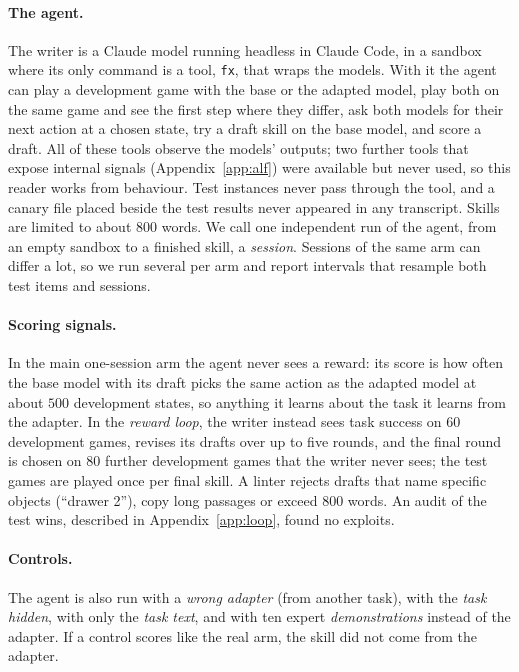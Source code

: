\documentclass[11pt]{article}
\begin{document}
\paragraph{The agent.} The writer is a Claude model running headless in Claude Code, in a sandbox where its only command is a tool, \texttt{fx},
that wraps the models. With it the agent can play a development game with the base or the adapted model, play both on the same game and see the
first step where they differ, ask both models for their next action at a chosen state, try a draft skill on the base model, and score a draft.
All of these tools observe the models' outputs; two further tools that expose internal signals (Appendix~\ref{app:alf}) were available but
never used, so this reader works from behaviour. Test instances never pass through the tool, and a canary file placed beside the test results never appeared in any transcript. Skills are limited
to about $800$ words. We call one independent run of the agent, from an empty sandbox to a finished skill, a \emph{session}. Sessions of the same arm
can differ a lot, so we run several per arm and report intervals that resample both test items and sessions.

\paragraph{Scoring signals.} In the main one-session arm the agent never sees a reward: its score is how often the base model with its draft picks the
same action as the adapted model at about $500$ development states, so anything it learns about the task it learns from the adapter. In the
\emph{reward loop}, the writer instead sees task success on $60$ development games, revises its drafts over up to five rounds, and the final round
is chosen on $80$ further development games that the writer never sees; the test games are played once per final skill. A linter rejects drafts that name specific objects (``drawer 2''), copy long passages or exceed $800$ words. An audit of the test wins,
described in Appendix~\ref{app:loop}, found no exploits.

\paragraph{Controls.} The agent is also run with a \emph{wrong adapter} (from another task), with the \emph{task hidden}, with only the \emph{task text},
and with ten expert \emph{demonstrations} instead of the adapter. If a control scores like the real arm, the skill did not come from the adapter.
\end{document}
